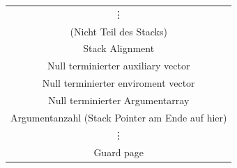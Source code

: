 \documentclass[german]{tum-presentation}
\begin{document}
\begin{frame}[fragile]
\begin{columns}[c, onlytextwidth]
\begin{column}{0.49\textwidth}
			\centering
			\onslide<3->
			\begin{tabular}{|c|}
				\hline
				\rule[-1ex]{0pt}{3ex} \vdots                                      \\
				(Nicht Teil des Stacks)                                               \\
				\hline
				\rule[-1ex]{0pt}{3ex} Stack Alignment                                 \\
				\hline
				\rule[-1ex]{0pt}{3ex} Null terminierter auxiliary vector              \\
				\hline
				\rule[-1ex]{0pt}{3ex} Null terminierter enviroment vector             \\
				\hline
				\rule[-1ex]{0pt}{3ex} Null terminierter Argumentarray                 \\
				\hline
				\rule[-1ex]{0pt}{3ex} Argumentanzahl (Stack Pointer am Ende auf hier) \\
				\hline
				\rule[-1ex]{0pt}{3ex} \vdots                                          \\
				\hline
				\rule[-1ex]{0pt}{3ex} Guard page                                      \\
				\hline
			\end{tabular}
		\end{column}
	\end{columns}
\end{frame}
\end{document}
